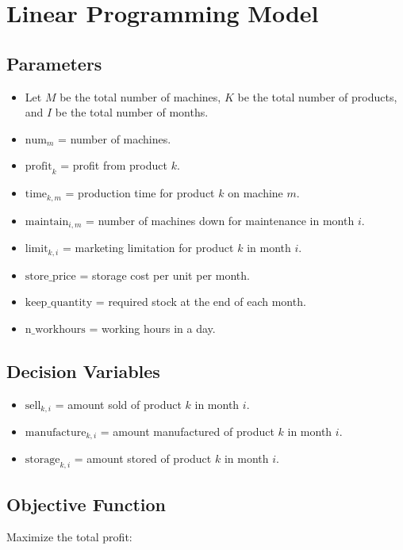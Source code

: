 \documentclass{article}
\begin{document}
\section*{Linear Programming Model}

\subsection*{Parameters}
\begin{itemize}
    \item Let \( M \) be the total number of machines, \( K \) be the total number of products, and \( I \) be the total number of months.
    \item \( \text{num}_m \) = number of machines.
    \item \( \text{profit}_k \) = profit from product \( k \).
    \item \( \text{time}_{k,m} \) = production time for product \( k \) on machine \( m \).
    \item \( \text{maintain}_{i,m} \) = number of machines down for maintenance in month \( i \).
    \item \( \text{limit}_{k,i} \) = marketing limitation for product \( k \) in month \( i \).
    \item \( \text{store\_price} \) = storage cost per unit per month.
    \item \( \text{keep\_quantity} \) = required stock at the end of each month.
    \item \( \text{n\_workhours} \) = working hours in a day.
\end{itemize}

\subsection*{Decision Variables}
\begin{itemize}
    \item \( \text{sell}_{k,i} \) = amount sold of product \( k \) in month \( i \).
    \item \( \text{manufacture}_{k,i} \) = amount manufactured of product \( k \) in month \( i \).
    \item \( \text{storage}_{k,i} \) = amount stored of product \( k \) in month \( i \).
\end{itemize}

\subsection*{Objective Function}
Maximize the total profit:
\end{document}
